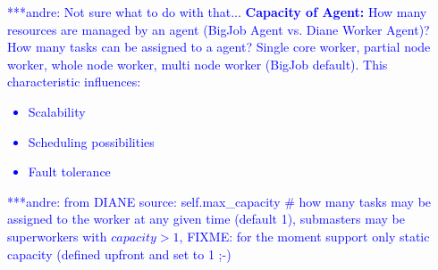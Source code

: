 \documentclass[conference,final]{IEEEtran}
\newcommand{\alnote}[1]{ {\textcolor{blue} { ***andre: #1 }}}
\newcommand{\alnote}[1]{}
\begin{document}


\alnote{Not sure what to do with that...
\textbf{Capacity of Agent:} How many resources are managed by an agent (BigJob Agent vs. Diane Worker Agent)? How many tasks can be assigned to a agent? Single core worker, partial node worker, whole node worker, multi node worker (BigJob
default). This characteristic influences: 
    \begin{itemize}
        \item Scalability
        \item Scheduling possibilities
        \item Fault tolerance
    \end{itemize}
    \alnote{from DIANE source: self.max\_capacity \# how many tasks may be 
    assigned to the worker at any given time (default 1), submasters may be 
    superworkers with $capacity>1$, FIXME: for the moment support only static 
    capacity (defined upfront and set to 1 ;-)}    
}
\end{document}
